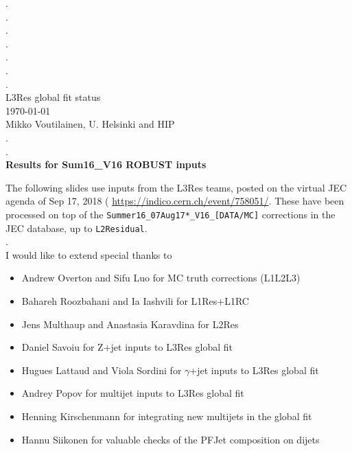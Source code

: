 \documentclass[landscape,10pt]{beamer} %
\begin{document}
\begin{centering}
{. }\\
{. }\\
{. }\\
{. }\\
{. }\\
{. }\\
{. }\\
L3Res global fit status\\
\today\\
Mikko Voutilainen, U. Helsinki and HIP\\
{. }\\
{. }\\
{\bf Results for Sum16\_V16 ROBUST inputs}\\
\end{centering}

\newpage

The following slides use inputs from the L3Res teams, posted on the virtual JEC agenda of Sep 17, 2018 ( \url{https://indico.cern.ch/event/758051/}.
These have been processed on top of the \verb|Summer16_07Aug17*_V16_[DATA/MC]| corrections in the JEC database, up to \verb|L2Residual|.\\
.\\
I would like to extend special thanks to
\begin{itemize}
  \item Andrew Overton and Sifu Luo for MC truth corrections (L1L2L3)
  \item Bahareh Roozbahani and Ia Iashvili for L1Res+L1RC
  \item Jens Multhaup and Anastasia Karavdina for L2Res
  \item Daniel Savoiu for Z+jet inputs to L3Res global fit
  \item Hugues Lattaud and Viola Sordini for $\gamma$+jet inputs to L3Res global fit
  \item Andrey Popov for multijet inputs to L3Res global fit
  \item Henning Kirschenmann for integrating new multijets in the global fit
  \item Hannu Siikonen for valuable checks of the PFJet composition on dijets
\end{itemize}
\end{document}
